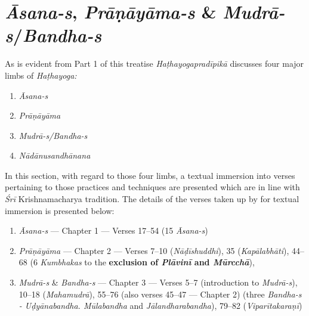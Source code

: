 \part{\textit{Āsana-s}, \textit{Prāṇāyāma-s} \& \textit{Mudrā-s}/\textit{Bandha-s}}


As is evident from Part 1 of this treatise \textit{Haṭhayogapradīpikā} discusses four major limbs of \textit{Haṭhayoga:} 
\begin{enumerate}
\itemsep=0pt
\renewcommand{\theenumi}{\alph{enumi}}
\renewcommand{\labelenumi}{\theenumi)}
\item \textit{Āsana-s}
\item \textit{Prāṇāyāma}
\item \textit{Mudrā-s/Bandha-s} 
\item \textit{Nādānusandhānana}
\end{enumerate}

In this section, with regard to those four limbs, a textual immersion into verses pertaining to those practices and techniques are presented which are in line with \textit{Śrī} Krishnamacharya tradition. The details of the verses taken up by for textual immersion is presented below:

\begin{enumerate}
\itemsep=0pt
\item \textit{Āsana-s} --- Chapter 1 --- Verses 17--54 (15 \textit{Āsana-s})
\item \textit{Prāṇāyāma} --- Chapter 2 ---  Verses 7--10 (\textit{Nāḍīshuddhi}), 35 (\textit{Kapālabhāti}), 44--68 (6 \textit{Kumbhakas} to the \textbf{exclusion of \textit{Plāvinī} and \textit{Mūrcchā}}), 
\item \textit{Mudrā-s} \& \textit{Bandha-s} --- Chapter 3 --- Verses 5--7 (introduction to \textit{Mudrā-s}), 10--18 (\textit{Mahamudrā}), 55--76 (also verses 45--47 --- Chapter 2) (three \textit{Bandha-s - Uḍyānabandha. Mūlabandha} and \textit{Jālandharabandha}), 79--82 (\textit{Viparītakaraṇī})
\end{enumerate}



